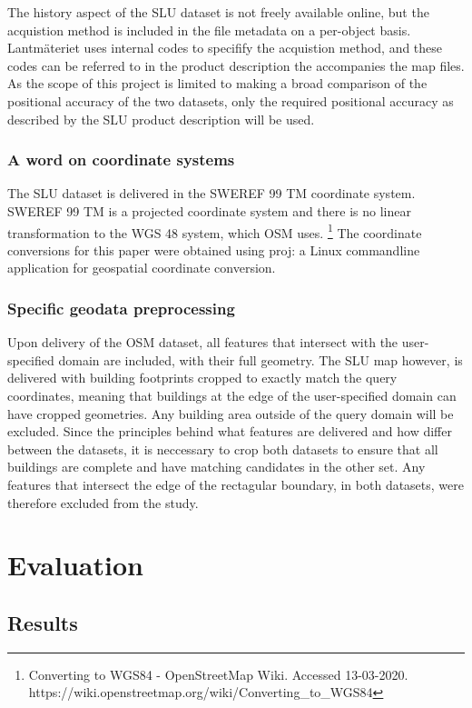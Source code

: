 \documentclass{kththesis}
\begin{document}
The history aspect of the SLU dataset is not freely available online, but the acquistion method is included in the file metadata on a per-object basis.
Lantmäteriet uses internal codes to specifify the acquistion method, and these codes can be referred to in the product description the accompanies the map files.
As the scope of this project is limited to making a broad comparison of the positional accuracy of the two datasets, only the required positional accuracy as described by the SLU product description will be used.

\subsection{A word on coordinate systems}

The SLU dataset is delivered in the SWEREF 99 TM coordinate system.
SWEREF 99 TM is a projected coordinate system and there is no linear transformation to the WGS 48 system, which OSM uses. \footnote{Converting to WGS84 - OpenStreetMap Wiki. Accessed 13-03-2020. https://wiki.openstreetmap.org/wiki/Converting\_to\_WGS84}
The coordinate conversions for this paper were obtained using proj: a Linux commandline application for geospatial coordinate conversion.

\subsection{Specific geodata preprocessing}

Upon delivery of the OSM dataset, all features that intersect with the user-specified domain are included, with their full geometry.
The SLU map however, is delivered with building footprints cropped to exactly match the query coordinates, meaning that buildings at the edge of the user-specified domain can have cropped geometries.
Any building area outside of the query domain will be excluded.
Since the principles behind what features are delivered and how differ between the datasets, it is neccessary to crop both datasets to ensure that all buildings are complete and have matching candidates in the other set.
Any features that intersect the edge of the rectagular boundary, in both datasets, were therefore excluded from the study.

\chapter{Evaluation}

\section{Results}
\end{document}
